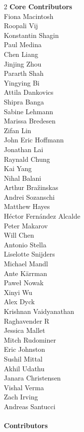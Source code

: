 \begin{multicols}{2}
\noindent
\textbf{Core Contributors} \\
Fiona Macintosh \\
Roopali Vij \\
Konstantin Shagin \\
Paul Medina \\
Chen Liang \\
Jinjing Zhou \\
Pararth Shah \\
Yingying Bi \\
Attila Dankovics \\
Shipra Banga \\ 
Sabine Lehmann \\
Marissa Bredesen \\
Zifan Lin \\
John Eric Hoffmann \\
Jonathan Lai \\
Raynald Chung \\
Kai Yang \\
Nihal Balani \\
Arthur Bražinskas \\
Andrei Sozanschi \\
Matthew Hayes \\
Héctor Fernández Alcalde \\
Peter Makarov \\
Will Chen \\
Antonio Stella \\
Liselotte Snijders \\
Michael Mandl \\
Ante Kärrman \\
Paweł Nowak \\
Xinyi Wu \\
Alex Dyck \\
Krishnan Vaidyanathan \\
Raghavender R \\
Jessica Mallet \\
Mitch Rudominer \\
Eric Johnston \\
Sushil Mittal \\
Akhil Udathu \\
Janara Christensen \\
Vishal Verma \\
Zach Irving \\
Andreas Santucci \\
\\
\textbf{Contributors} \\

\end{multicols}
